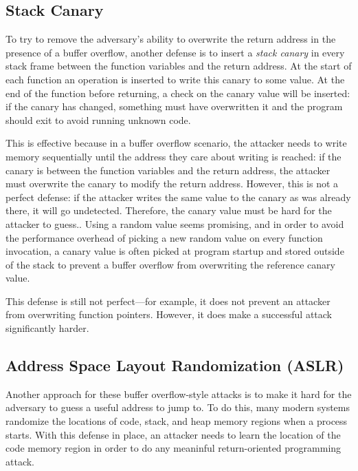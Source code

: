 \subsection{Stack Canary}
To try to remove the adversary's ability to overwrite the return address in the presence of a buffer overflow, another defense is to insert a \emph{stack canary} in every stack frame between the function variables and the return address. At the start of each function an operation is inserted to write this canary to some value. At the end of the function before returning, a check on the canary value will be inserted: if the canary has changed, something must have overwritten it and the program should exit to avoid running unknown code. 

This is effective because in a buffer overflow scenario, the attacker needs to write memory sequentially until the address they care about writing is reached: if the canary is between the function variables and the return address, the attacker must overwrite the canary to modify the return address. However, this is not a perfect defense: if the attacker writes the same value to the canary as was already there, it will go undetected. Therefore, the canary value must be hard for the attacker to guess.. Using a random value seems promising, and in order to avoid the performance overhead of picking a new random value on every function invocation, a canary value is often picked at program startup and stored outside of the stack to prevent a buffer overflow from overwriting the reference canary value.

This defense is still not perfect---for example, it does not prevent an attacker from overwriting function pointers. However, it does make a successful attack significantly harder.

\subsection{Address Space Layout Randomization (ASLR)}
Another approach for these buffer overflow-style attacks is to make it hard for the adversary to guess a useful address to jump to. To do this, many modern systems randomize the locations of code, stack, and heap memory regions when a process starts. With this defense in place, an attacker needs to learn the location of the code memory region in order to do any meaninful return-oriented programming attack.

